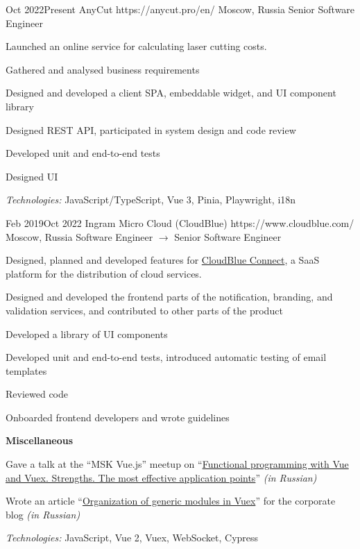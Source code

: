 \documentclass[10pt]{article}
\begin{document}
\job
	{Oct 2022}{Present}
	{AnyCut}
	{https://anycut.pro/en/}
	{Moscow, Russia}
	{Senior Software Engineer}
	{
	  Launched an online service for calculating laser cutting costs.

	  \begin{supercompactitemize}
	  	\item Gathered and analysed business requirements
		\item Designed and developed a client SPA, embeddable widget, and UI component library
		\item Designed REST API, participated in system design and code review
		\item Developed unit and end-to-end tests
		\item Designed UI
	  \end{supercompactitemize}

	  \textit{Technologies:} JavaScript/TypeScript, Vue 3, Pinia, Playwright, i18n
	}

\job
	{Feb 2019}{Oct 2022}
	{Ingram Micro Cloud (CloudBlue)}
	{https://www.cloudblue.com/}
	{Moscow, Russia}
	{Software Engineer $\rightarrow$ Senior Software Engineer}
	{
	  Designed, planned and developed features for \href{https://connect.cloudblue.com/community/}{CloudBlue Connect}, a SaaS platform for the distribution of cloud services.

	  \begin{supercompactitemize}
	  	\item Designed and developed the frontend parts of the notification, branding, and validation services, and contributed to other parts of the product
	  	\item Developed a library of UI components
	  	\item Developed unit and end-to-end tests, introduced automatic testing of email templates
	  	\item Reviewed code
	  	\item Onboarded frontend developers and wrote guidelines
	  \end{supercompactitemize}

	  \textbf{Miscellaneous}

	  \begin{supercompactitemize}
		\item Gave a talk at the ``MSK Vue.js'' meetup on ``\href{https://www.youtube.com/watch?v=Rz_RynHNZKg}{Functional programming with Vue and Vuex. Strengths. The most effective application points}'' \textit{(in Russian)}
		\item Wrote an article ``\href{https://habr.com/ru/company/odin_ingram_micro/blog/526094/}{Organization of generic modules in Vuex}'' for the corporate blog \textit{(in Russian)}
	  \end{supercompactitemize}

	  \textit{Technologies:} JavaScript, Vue 2, Vuex, WebSocket, Cypress
	}
\end{document}
